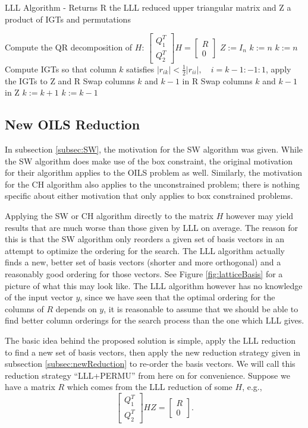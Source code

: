 \documentclass[12pt,Bold,letterpaper]{mcgilletdclass}
\newcommand{\bsmx}{\left[\begin{smallmatrix}}
\newcommand{\esmx}{\end{smallmatrix}\right]}
\newcommand{\vsp}{\vspace{\baselineskip}}
\begin{document}
\begin{algorithm}
\caption{LLL Algorithm - Returns R the LLL reduced upper triangular matrix and Z a product of IGTs and permutations}
\label{alg:LLL}
\begin{algorithmic}[1]
\STATE Compute the QR decomposition of $H$: $\bsmx Q_1^T \\ Q_2^T \esmx H= \bsmx R\\ 0 \esmx$
\STATE $Z := I_n$
\STATE $k := n$
		\STATE $k := n$	
	\ENDIF
	\STATE Compute IGTs so that column $k$ satisfies $|r_{ik}| < \frac{1}{2}|r_{ii}|, \quad i = k-1:-1:1$, apply the IGTs 		to Z and R
		\STATE Swap columns $k$ and $k-1$ in R
		\STATE Swap columns $k$ and $k-1$ in Z
		\STATE $k := k+1$
	\ELSE
		\STATE $k := k-1$
	\ENDIF
\ENDWHILE
\end{algorithmic}
\end{algorithm}

\vsp \subsection{New OILS Reduction}
In subsection \ref{subsec:SW}, the motivation for the SW algorithm was given. While the SW algorithm does make use of the box constraint, the original motivation for their algorithm applies to the OILS problem as well. Similarly, the motivation for the CH algorithm also applies to the unconstrained problem; there is nothing specific about either motivation that only applies to box constrained problems. 

Applying the SW or CH algorithm directly to the matrix $H$ however may yield results that are much worse than those given by LLL on average. The reason for this is that the SW algorithm only reorders a given set of basis vectors in an attempt to optimize the ordering for the search. The LLL algorithm actually finds a new, better set of basis vectors (shorter and more orthogonal) and a reasonably good ordering for those vectors. See Figure \ref{fig:latticeBasis} for a picture of what this may look like. The LLL algorithm however has no knowledge of the input vector $y$, since we have seen that the optimal ordering for the columns of $R$ depends on $y$, it is reasonable to assume that we should be able to find better column orderings for the search process than the one which LLL gives.

The basic idea behind the proposed solution is simple, apply the LLL reduction
to find a new set of basis vectors, then apply the new reduction strategy given
in subsection \ref{subsec:newReduction} to re-order the basis vectors. We will
call this reduction strategy ``LLL+PERMU'' from here on for convenience. Suppose
we have a matrix $R$ which comes from the LLL reduction of some $H$, e.g.,
$$\begin{bmatrix}
Q_1^T\\ 
Q_2^T
\end{bmatrix}
HZ = 
\begin{bmatrix}
R\\ 
0
\end{bmatrix}.$$
\end{document}
